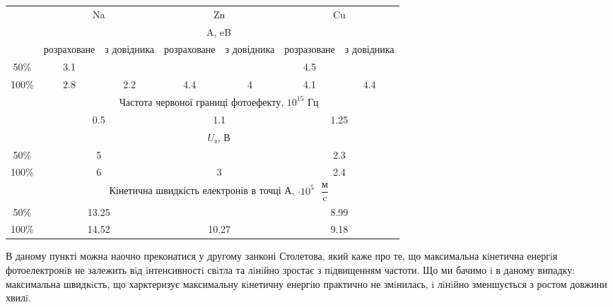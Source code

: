 \documentclass[a4paper,14pt]{extreport}
\begin{document}
		\begin{center}
	\end{center}
	\begin{table}[h]
	\begin{small}
		\begin{tabular}{|l|c|c|c|c|c|c|}
		\hline
		& \multicolumn{2}{c|}{\cellcolor[HTML]{FFCCC9}Na} & \multicolumn{2}{c|}{\cellcolor[HTML]{FFFFC7}Zn} & \multicolumn{2}{c|}{\cellcolor[HTML]{ECF4FF}Cu} \\ \cline{2-7} 
		& \multicolumn{6}{c|}{\cellcolor[HTML]{CBCEFB}A, eB} \\ \cline{2-7} 
		\multirow{-3}{*}{} & розраховане & з довідника & розраховане & з довідника & розразоване & з довідника \\ \hline
		\multicolumn{1}{|c|}{50\%} & 3.1 &  &  &  & 4.5 &  \\ \cline{1-2} \cline{6-6}
		\multicolumn{1}{|c|}{100\%} & 2.8 & \multirow{-2}{*}{2.2} & \multirow{-2}{*}{4.4} & \multirow{-2}{*}{4} & 4.1 & \multirow{-2}{*}{4.4} \\ \hline
		& \multicolumn{6}{c|}{\cellcolor[HTML]{CBCEFB}Частота червоної границі фотоефекту, $10^{15} $ Гц} \\ \cline{2-7} 
		& \multicolumn{2}{c|}{0.5} & \multicolumn{2}{c|}{1.1} & \multicolumn{2}{c|}{1.25} \\ \cline{2-7} 
		\multirow{-3}{*}{} & \multicolumn{6}{c|}{\cellcolor[HTML]{CBCEFB}$U_{\text{з}}$,  В} \\ \hline
		\multicolumn{1}{|c|}{50\%} & \multicolumn{2}{c|}{5} & \multicolumn{2}{c|}{} & \multicolumn{2}{c|}{2.3} \\ \cline{1-3} \cline{6-7} 
		\multicolumn{1}{|c|}{100\%} & \multicolumn{2}{c|}{6} & \multicolumn{2}{c|}{\multirow{-2}{*}{3}} & \multicolumn{2}{c|}{2.4} \\ \hline
		& \multicolumn{6}{c|}{\cellcolor[HTML]{CBCEFB}Кінетична швидкість електронів в точці А, $\cdot 10^{5}  \text{ }\dfrac{\text{м}}{\text{c}}$} \\ \hline
		\multicolumn{1}{|c|}{50\%} & \multicolumn{2}{c|}{13.25} & \multicolumn{2}{c|}{} & \multicolumn{2}{c|}{8.99} \\ \cline{1-3} \cline{6-7} 
		\multicolumn{1}{|c|}{100\%} & \multicolumn{2}{c|}{14.52} & \multicolumn{2}{c|}{\multirow{-2}{*}{10.27}} & \multicolumn{2}{c|}{9.18} \\ \hline
		\end{tabular}	
		\end{small}
	\end{table}
	В даному пункті можна наочно преконатися у другому занконі Столетова, який каже про те, що максимальна кiнетична енергiя
	фотоелектронiв не залежить вiд iнтенсивностi свiтла та лiнiйно зростає з пiдвищенням частоти. Що ми бачимо i в даному випадку: максимальна швидкiсть, що харктеризує максимальну кiнетичну енергiю практично не змiнилась, i лiнiйно зменшується з ростом довжини хвилi.
	
\end{document}
